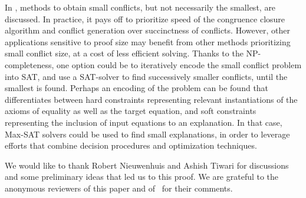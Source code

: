 \documentclass[smallextended]{svjour3}
\begin{document}
In \cite{Fontaine1,Nieuwenhuis3,Nieuwenhuis9}, methods to obtain small
conflicts, but not necessarily the smallest, are discussed.  In practice, it
pays off to prioritize speed of the congruence closure algorithm and conflict
generation over succinctness of conflicts.  However, other applications
sensitive to proof size may benefit from other methods prioritizing small
conflict size, at a cost of less efficient solving. Thanks to the
NP-completeness, one option could be to iteratively encode the small conflict
problem into SAT, and use a SAT-solver to find successively smaller conflicts,
until the smallest is found. 
Perhaps an encoding of the problem can be found that differentiates between hard constraints representing relevant instantiations of the axioms of equality as well as the target equation,
and soft constraints representing the inclusion of input equations to an explanation.
In that case, Max-SAT solvers could be used to find small explanations, 
in order to leverage efforts that combine decision procedures and optimization techniques. %

\vspace*{5pt} We would like to thank Robert
Nieuwenhuis and Ashish Tiwari for discussions and some preliminary ideas that
led us to this proof.  We are grateful to the anonymous reviewers of this paper
and of~\cite{Fellner1} for their comments.


%

\end{document}

